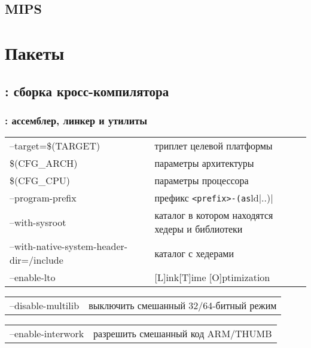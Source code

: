 \subsection{MIPS}




\section{Пакеты}\label{azpacks}

\subsection{: сборка кросс-компилятора} \label{aztc}


\subsubsection{: ассемблер, линкер и утилиты} \label{azbinutils}

\begin{tabular}{l l}
--target=\$(TARGET)& триплет целевой платформы\\
\$(CFG\_ARCH)&параметры архитектуры\\
\$(CFG\_CPU)&параметры процессора\\
--program-prefix&префикс \verb|<prefix>-(as|ld|..)|\\
--with-sysroot& каталог в котором находятся хедеры и библиотеки\\
--with-native-system-header-dir=/include&каталог с хедерами\\
--enable-lto&[L]ink[T]ime [O]ptimization\\
\end{tabular}

\clearpage
{}

\begin{tabular}{l l}
--disable-multilib&выключить смешанный 32/64-битный режим\\
\end{tabular}


\begin{tabular}{l l}
--enable-interwork&разрешить смешанный код ARM/THUMB\\
\end{tabular}

